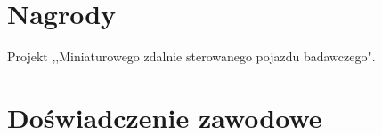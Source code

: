 \documentclass[letterpaper]{template/twentysecondcv} %
\begin{document}




\vspace{-0.25cm}
\section{Nagrody}

\begin{twentyshort} %
	 {Projekt ,,Miniaturowego zdalnie sterowanego pojazdu badawczego".}
\end{twentyshort}

\vspace{-0.25cm}
\section{Doświadczenie zawodowe}
\end{document}
